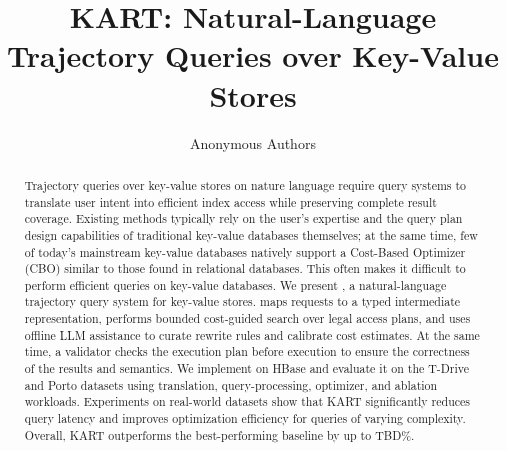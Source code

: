 \documentclass[a4paper,runningheads]{llncs}
\title{KART: Natural-Language Trajectory Queries over Key-Value Stores}
\author{Anonymous Authors}
\institute{}
\begin{document}
\maketitle
\begin{abstract}
Trajectory queries over key-value stores on nature language require query systems to translate user intent into efficient index access while preserving complete result coverage. 
Existing methods typically rely on the user’s expertise and the query plan design capabilities of traditional key-value databases themselves; at the same time, few of today’s mainstream key-value databases natively support a Cost-Based Optimizer (CBO) similar to those found in relational databases. This often makes it difficult to perform efficient queries on key-value databases.
We present \KART{}, a natural-language trajectory query system for key-value stores. 
\KART{} maps requests to a typed intermediate representation, performs bounded cost-guided search over legal access plans, and uses offline LLM assistance to curate rewrite rules and calibrate cost estimates. 
At the same time, a validator checks the execution plan before execution to ensure the correctness of the results and semantics.
We implement \KART{} on HBase and evaluate it on the T-Drive and Porto datasets using translation, query-processing, optimizer, and ablation workloads. 
Experiments on real-world datasets show that KART significantly reduces query latency and improves optimization efficiency for queries of varying complexity. Overall, KART outperforms the best-performing baseline by up to TBD\%.
\end{abstract}









\end{document}
